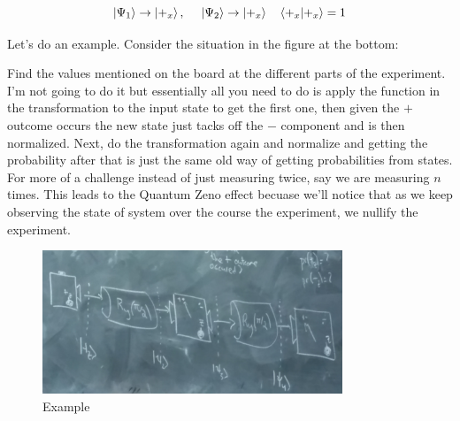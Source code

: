 \documentclass[english, 11pt]{article}
\begin{document}
      \[ \ket{\Psi_1} \rightarrow \ket{+_x}, \ \ \ \ \ket{\Psi_2} \rightarrow \ket{+_x} \ \ \ \braket{+_x}{+_x} = 1 \]

      Let's do an example. Consider the situation in the figure at the bottom:

      Find the values mentioned on the board at the different parts of the experiment. I'm not going to do it but essentially all you need to do is apply the function in the transformation to the input state to get the first one, then given the $+$ outcome occurs the new state just tacks off the $-$ component and is then normalized. Next, do the transformation again and normalize and getting the probability after that is just the same old way of getting probabilities from states. For more of a challenge instead of just measuring twice, say we are measuring $n$ times. This leads to the Quantum Zeno effect becuase we'll notice that as we keep observing the state of system over the course the experiment, we nullify the experiment.

      \begin{figure}[b!]
            \centering
            \includegraphics[width=0.8\textwidth]{axiom3_exmp.jpg}
            \caption{Example}
      \end{figure}

  
\end{document}
